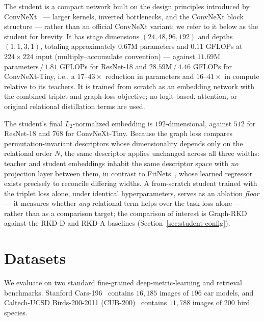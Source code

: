 \documentclass[11pt,letterpaper]{article}
\begin{document}
The student is a compact network built on the design principles introduced by
ConvNeXt~\cite{liu2022convnext} --- larger kernels, inverted bottlenecks, and the
ConvNeXt block structure --- rather than an official ConvNeXt variant; we refer to it
below as the student for brevity. It has stage
dimensions $(24, 48, 96, 192)$ and depths $(1, 1, 3, 1)$, totaling approximately
$0.67$M parameters and $0.11$ GFLOPs at $224 \times 224$ input
(multiply--accumulate convention) --- against $11.69$M parameters\,/\,$1.81$
GFLOPs for ResNet-18 and $28.59$M\,/\,$4.46$ GFLOPs for ConvNeXt-Tiny, i.e., a
$17$--$43\times$ reduction in parameters and $16$--$41\times$ in compute relative
to its teachers. It is trained from scratch
as an embedding network with the combined triplet and graph-loss objective; no
logit-based, attention, or original relational distillation terms are used.

The student's final $L_2$-normalized embedding is $192$-dimensional, against $512$
for ResNet-18 and $768$ for ConvNeXt-Tiny. Because the graph loss compares
permutation-invariant descriptors whose dimensionality depends only on the relational
order $N$, the same descriptor applies unchanged across all three widths: teacher and
student embeddings inhabit the same descriptor space with \emph{no} projection layer
between them, in contrast to FitNets~\cite{romero2015fitnets}, whose learned regressor
exists precisely to reconcile differing widths. A from-scratch student trained with
the triplet loss alone, under identical hyperparameters, serves as an ablation
\emph{floor} --- it measures whether \emph{any} relational term helps over the task
loss alone --- rather than as a comparison target; the comparison of interest is
Graph-RKD against the RKD-D and RKD-A baselines (Section~\ref{sec:student-config}).

\section{Datasets}
\label{sec:datasets}

We evaluate on two standard fine-grained deep-metric-learning and retrieval
benchmarks. Stanford Cars-196~\cite{krause2013cars} contains $16{,}185$ images of
$196$ car models, and Caltech-UCSD Birds-200-2011 (CUB-200)~\cite{wah2011cub}
contains $11{,}788$ images of $200$ bird species.
\end{document}
